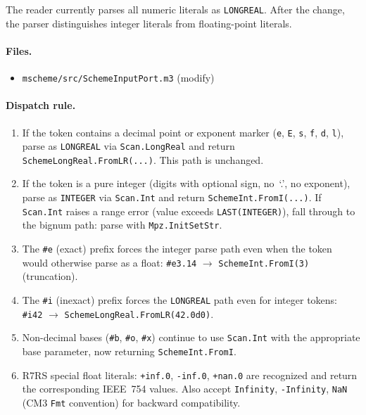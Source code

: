 \documentclass[12pt]{article}
\begin{document}
The reader currently parses all numeric literals as {\tt LONGREAL}.
After the change, the parser distinguishes integer literals from
floating-point literals.

\paragraph{Files.}
\begin{itemize}[nosep]
\item {\tt mscheme/src/SchemeInputPort.m3} (modify)
\end{itemize}

\paragraph{Dispatch rule.}
\begin{enumerate}[nosep]
\item If the token contains a decimal point or exponent marker
  ({\tt e}, {\tt E}, {\tt s}, {\tt f}, {\tt d}, {\tt l}),
  parse as {\tt LONGREAL} via {\tt Scan.LongReal} and return
  {\tt SchemeLongReal.FromLR(...)}.  This path is unchanged.

\item If the token is a pure integer (digits with optional sign,
  no~`.', no exponent), parse as {\tt INTEGER} via {\tt Scan.Int}
  and return {\tt SchemeInt.FromI(...)}.  If {\tt Scan.Int} raises
  a range error (value exceeds {\tt LAST(INTEGER)}), fall through
  to the bignum path: parse with {\tt Mpz.InitSetStr}.

\item The {\tt \#e} (exact) prefix forces the integer parse path
  even when the token would otherwise parse as a float:
  {\tt \#e3.14} $\to$ {\tt SchemeInt.FromI(3)} (truncation).

\item The {\tt \#i} (inexact) prefix forces the {\tt LONGREAL} path
  even for integer tokens: {\tt \#i42} $\to$
  {\tt SchemeLongReal.FromLR(42.0d0)}.

\item Non-decimal bases ({\tt \#b}, {\tt \#o}, {\tt \#x}) continue
  to use {\tt Scan.Int} with the appropriate base parameter, now
  returning {\tt SchemeInt.FromI}.

\item R7RS special float literals: {\tt +inf.0}, {\tt -inf.0},
  {\tt +nan.0} are recognized and return the corresponding
  IEEE~754 values.  Also accept {\tt Infinity}, {\tt -Infinity},
  {\tt NaN} (CM3 {\tt Fmt} convention) for backward compatibility.
\end{enumerate}
\end{document}
